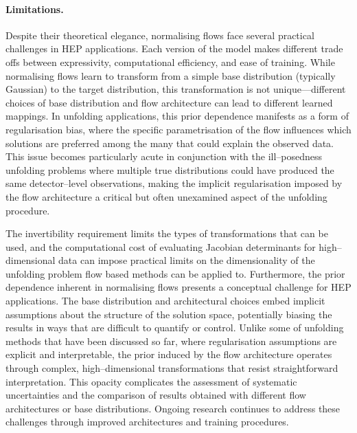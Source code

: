         \paragraph{Limitations.}
            Despite their theoretical elegance, normalising flows face several practical challenges in HEP applications.
            Each version of the model makes different trade offs between expressivity, computational efficiency, and ease of training.
            While normalising flows learn to transform from a simple base distribution (typically Gaussian) to the target distribution, this transformation is not unique---different choices of base distribution and flow architecture can lead to different learned mappings.
            In unfolding applications, this prior dependence manifests as a form of regularisation bias, where the specific parametrisation of the flow influences which solutions are preferred among the many that could explain the observed data.
            This issue becomes particularly acute in conjunction with the ill--posedness unfolding problems where multiple true distributions could have produced the same detector--level observations, making the implicit regularisation imposed by the flow architecture a critical but often unexamined aspect of the unfolding procedure.
            
            The invertibility requirement limits the types of transformations that can be used, and the computational cost of evaluating Jacobian determinants for high--dimensional data can impose practical limits on the dimensionality of the unfolding problem flow based methods can be applied to.
            Furthermore, the prior dependence inherent in normalising flows presents a conceptual challenge for HEP applications.
            The base distribution and architectural choices embed implicit assumptions about the structure of the solution space, potentially biasing the results in ways that are difficult to quantify or control.
            Unlike some of unfolding methods that have been discussed so far, where regularisation assumptions are explicit and interpretable, the prior induced by the flow architecture operates through complex, high--dimensional transformations that resist straightforward interpretation.
            This opacity complicates the assessment of systematic uncertainties and the comparison of results obtained with different flow architectures or base distributions.
            Ongoing research continues to address these challenges through improved architectures and training procedures.
        
